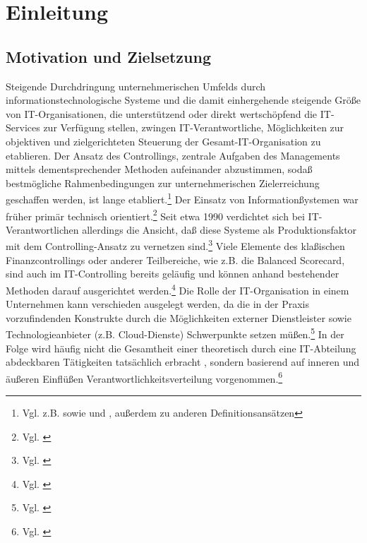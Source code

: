 \section{Einleitung}
\subsection{Motivation und Zielsetzung}
Steigende Durchdringung unternehmerischen Umfelds durch informationstechnologische Systeme und die damit einhergehende steigende Gr\"o{\ss}e von IT-Organisationen, die unterst\"utzend oder direkt wertsch\"opfend die IT-Services zur Verf\"ugung stellen, zwingen IT-Verantwortliche, M\"oglichkeiten zur objektiven und zielgerichteten Steuerung der Gesamt-IT-Organisation zu etablieren.\newline
Der Ansatz des Controllings, zentrale Aufgaben des Managements mittels dementsprechender Methoden aufeinander abzustimmen, soda{\ss} bestm\"ogliche Rahmenbedingungen zur unternehmerischen Zielerreichung geschaffen werden, ist lange etabliert.\footnote{Vgl. z.B. \cite[S.176f]{woehe2016einfuehrung} sowie \cite[S.25]{Horvath2015} und \cite[S.33ff]{kuepper2013controlling}, au{\ss}erdem \cite[S.20ff]{weber2015einfuehrung} zu anderen Definitionsans\"atzen}\newline
Der Einsatz von Information{\ss}ystemen war fr\"uher prim\"ar technisch orientiert.\footnote{Vgl. \cite[S.VII]{Gadatsch2014}}\newline
Seit etwa 1990 verdichtet sich bei IT-Verantwortlichen allerdings die Ansicht, da{\ss} diese Systeme als Produktionsfaktor mit dem Controlling-Ansatz zu vernetzen sind.\footnote{Vgl. \cite[S.VII]{Gadatsch2014}}
Viele Elemente des kla{\ss}ischen Finanzcontrollings oder anderer Teilbereiche, wie z.B. die Balanced Scorecard, sind auch im IT-Controlling bereits gel\"aufig und k\"onnen anhand bestehender Methoden darauf ausgerichtet werden.\footnote{Vgl. \cite[S.46]{kesten2013}}\newline
Die Rolle der IT-Organisation in einem Unternehmen kann verschieden ausgelegt werden, da die in der Praxis vorzufindenden Konstrukte durch die M\"oglichkeiten externer Dienstleister sowie Technologieanbieter (z.B. Cloud-Dienste) Schwerpunkte setzen m\"u{\ss}en.\footnote{Vgl. \cite[S.581f]{schroederHMD2016}}\newline
In der Folge wird h\"aufig nicht die Gesamtheit einer theoretisch durch eine IT-Abteilung abdeckbaren T\"atigkeiten tats\"achlich erbracht , sondern basierend auf inneren und \"au{\ss}eren Einfl\"u{\ss}en Verantwortlichkeitsverteilung vorgenommen.\footnote{Vgl. \cite[S.585-590]{schroederHMD2016}}\newline
